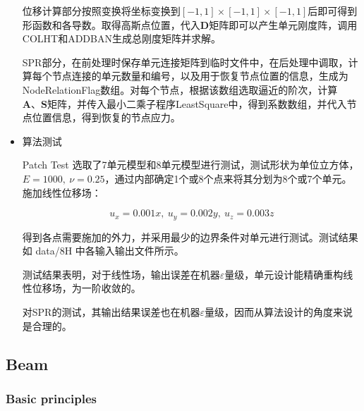 \documentclass[UTF8]{ctexbook}
\begin{document}
\begin{itemize}
位移计算部分按照变换将坐标变换到$[-1,1]\times[-1,1]\times[-1,1]$后即可得到形函数和各导数。取得高斯点位置，代入$\boldsymbol{D}$矩阵即可以产生单元刚度阵，调用COLHT和ADDBAN生成总刚度矩阵并求解。


SPR部分，在前处理时保存单元连接矩阵到临时文件中，在后处理中调取，计算每个节点连接的单元数量和编号，以及用于恢复节点位置的信息，生成为NodeRelationFlag数组。对每个节点，根据该数组选取逼近的阶次，计算$\boldsymbol{A}\text{、}\boldsymbol{S}$矩阵，并传入最小二乘子程序LeastSquare中，得到系数数组，并代入节点位置信息，得到恢复的节点应力。

\item 算法测试


Patch Test 选取了7单元模型和8单元模型进行测试，测试形状为单位立方体，$E=1000,\ \nu=0.25$，通过内部确定1个或8个点来将其分划为8个或7个单元。施加线性位移场：


\[
u_{x}=0.001x,\ u_{y}=0.002y,\ u_{z}=0.003z
\]



得到各点需要施加的外力，并采用最少的边界条件对单元进行测试。测试结果如 data/8H 中各输入输出文件所示。


测试结果表明，对于线性场，输出误差在机器$\varepsilon$量级，单元设计能精确重构线性位移场，为一阶收敛的。


对SPR的测试，其输出结果误差也在机器$\varepsilon$量级，因而从算法设计的角度来说是合理的。




\end{itemize}


\subsection{Beam}
\subsubsection{Basic principles}
\end{document}

